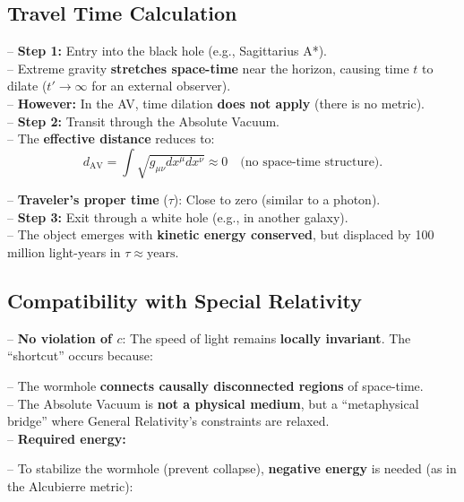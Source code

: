 \documentclass[a4paper]{article}
\theoremstyle{definition}
\theoremstyle{remark}
\numberwithin{equation}{section}
\begin{document}
	
	
\subsection{Travel Time Calculation}

– \textbf{Step 1:} Entry into the black hole (e.g., Sagittarius A*).\\

– Extreme gravity \textbf{stretches space-time} near the horizon, causing time \( t \) to dilate (\( t' \to \infty \) for an external observer).\\

– \textbf{However:} In the AV, time dilation \textbf{does not apply} (there is no metric).\\

– \textbf{Step 2:} Transit through the Absolute Vacuum.\\

– The \textbf{effective distance} reduces to:
\[
d_{\text{AV}} = \int \sqrt{g_{\mu\nu} dx^\mu dx^\nu} \approx 0 \quad \text{(no space-time structure)}.
\]

– \textbf{Traveler’s proper time} (\( \tau \)): Close to zero (similar to a photon).\\

– \textbf{Step 3:} Exit through a white hole (e.g., in another galaxy).\\

– The object emerges with \textbf{kinetic energy conserved}, but displaced by 100 million light-years in \( \tau \approx \text{years} \).

\subsection{Compatibility with Special Relativity}

– \textbf{No violation of \( c \)}: The speed of light remains \textbf{locally invariant}. The ``shortcut'' occurs because:

– The wormhole \textbf{connects causally disconnected regions} of space-time.\\

– The Absolute Vacuum is \textbf{not a physical medium}, but a ``metaphysical bridge'' where General Relativity’s constraints are relaxed.\\

– \textbf{Required energy:}

– To stabilize the wormhole (prevent collapse), \textbf{negative energy} is needed (as in the Alcubierre metric):
\end{document}
